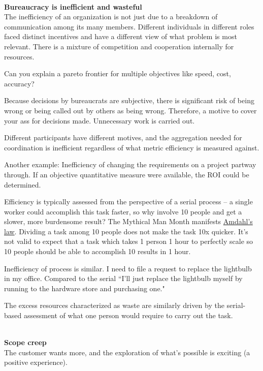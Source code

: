 \ \\

\textbf{Bureaucracy is inefficient and wasteful}\\
The inefficiency of an organization is not just due to a breakdown of communication among its many members. Different individuals in different roles faced distinct incentives and have a different view of what problem is most relevant. There is a mixture of competition and cooperation internally for resources.


Can you explain a pareto frontier for multiple objectives like speed, cost, accuracy?

Because decisions by bureaucrats are subjective, there is significant risk of being wrong or being called out by others as being wrong. Therefore, a motive to cover your ass for decisions made. Unnecessary work is carried out. 

Different participants have different motives, and the aggregation needed for coordination is inefficient regardless of what metric efficiency is measured against.

Another example: Inefficiency of changing the requirements on a project partway through. If an objective quantitative measure were available, the ROI could be determined. 

Efficiency is typically assessed from the perspective of a serial process -- a single worker could accomplish this task faster, so why involve 10 people and get a slower, more burdensome result? The Mythical Man Month manifests \href{https://en.wikipedia.org/wiki/Amdahl\%27s_law}{Amdahl's law}. Dividing a task among 10 people does not make the task 10x quicker. It's not valid to expect that a task which takes 1 person 1 hour to perfectly scale so 10 people should be able to accomplish 10 results in 1 hour.

Inefficiency of process is similar. I need to file a request to replace the lightbulb in my office. Compared to the serial ``I'll just replace the lightbulb myself by running to the hardware store and purchasing one."

The excess resources characterized as waste are similarly driven by the serial-based assessment of what one person would require to carry out the task. 

\ \\

\textbf{Scope creep} \\
The customer wants more, and the exploration of what's possible is exciting (a positive experience).

